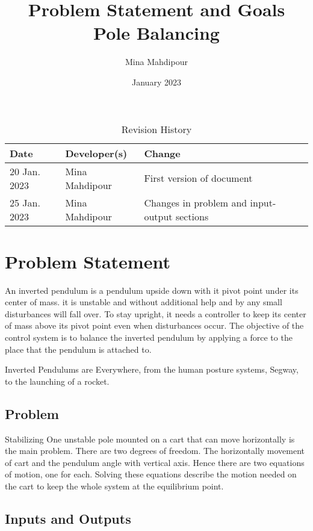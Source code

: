\documentclass{article}
\title{Problem Statement and Goals\\Pole Balancing}
\author{Mina Mahdipour}
\date{January 2023}
\begin{document}
\maketitle

\begin{table}[hp]
\caption{Revision History} \label{TblRevisionHistory}
\begin{tabularx}{\textwidth}{llX}
\toprule
\textbf{Date} & \textbf{Developer(s)} & \textbf{Change}\\
\midrule
20 Jan. 2023 & Mina Mahdipour & First version of document\\
25 Jan. 2023 & Mina Mahdipour & Changes in problem and input-output sections\\
\bottomrule
\end{tabularx}
\end{table}

\section{Problem Statement}

An inverted pendulum is a pendulum upside down with it pivot point under its center of mass. it is unstable and without additional help and by any small disturbances will fall over. To stay upright, it needs a controller to keep its center of mass above its pivot point even when disturbances occur. The objective of the control system is to balance the inverted pendulum by applying a force to the place that the pendulum is attached to.

Inverted Pendulums are Everywhere, from  the human posture systems, Segway, to the launching of a rocket.

\subsection{Problem}

Stabilizing One unstable pole mounted on a cart that can move horizontally is the main problem. There are two degrees of freedom. The horizontally movement of cart and the pendulum angle with vertical axis. Hence there are two equations of motion, one for each. Solving these equations describe the motion needed on the cart to keep the whole system at the equilibrium point.

\subsection{Inputs and Outputs}
\end{document}
